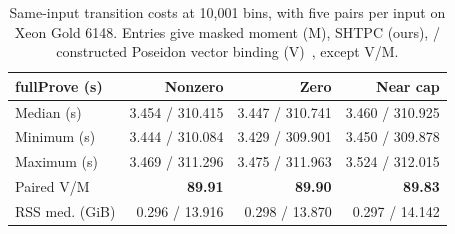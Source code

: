 \begin{table}[t]
\centering
\caption{Same-input transition costs at 10,001 bins, with five pairs per input on Xeon Gold 6148. Entries give masked moment (M), SHTPC (ours), / constructed Poseidon vector binding (V)~\cite{Grassi2021Poseidon}, except V/M.}
\label{tab:binding-cost}
\footnotesize
\renewcommand{\arraystretch}{1.06}
\setlength{\tabcolsep}{2pt}
\begin{tabular*}{\columnwidth}{@{\extracolsep{\fill}}lrrr@{}}
\toprule
\textbf{fullProve (s)} & \textbf{Nonzero} & \textbf{Zero} & \textbf{Near cap} \\
\midrule
\rowcolor{black!5} Median (s) & 3.454 / 310.415 & 3.447 / 310.741 & 3.460 / 310.925 \\
Minimum (s) & 3.444 / 310.084 & 3.429 / 309.901 & 3.450 / 309.878 \\
Maximum (s) & 3.469 / 311.296 & 3.475 / 311.963 & 3.524 / 312.015 \\
\rowcolor{black!5} Paired V/M & \textbf{89.91} & \textbf{89.90} & \textbf{89.83} \\
\midrule
RSS med. (GiB) & 0.296 / 13.916 & 0.298 / 13.870 & 0.297 / 14.142 \\
\bottomrule
\end{tabular*}
\end{table}
